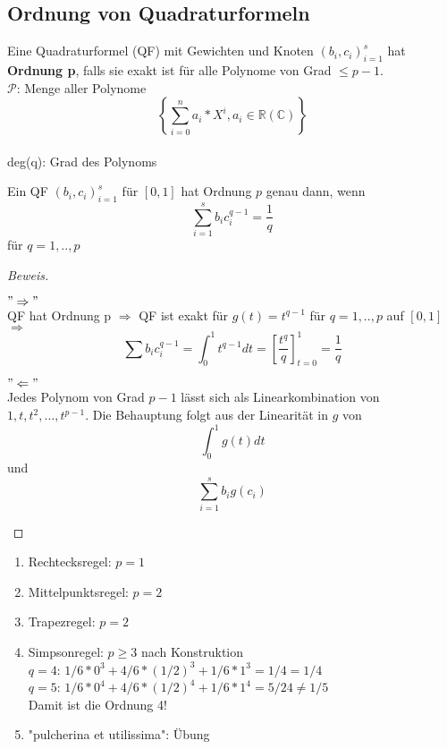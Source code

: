 \subsection{Ordnung von Quadraturformeln}

\begin{definition}
Eine Quadraturformel (QF) mit Gewichten und Knoten $(b_i, c_i)_{i=1}^{s}$ hat \textbf{Ordnung p}, falls sie exakt ist für alle Polynome von Grad $ \leq p-1$.\\
$\mathcal{P}$: Menge aller Polynome $$\left\{ \sum_{i=0}^{n}a_i*X^i , a_i \in \mathbb{R} (\mathbb{C}) \right\}  $$ \\
deg(q): Grad des Polynoms
\end{definition}

\begin{theorem}
Ein QF $(b_i, c_i)_{i=1}^{s}$ für $[0,1]$ hat Ordnung $p$ genau dann, wenn
$$\sum_{i=1}^{s} b_i c_i^{q-1} = \frac{1}{q}$$ für $q = 1,..,p$
\begin{proof}[Beweis]
\begin{description}
  \item
\end{description}
\begin{description}
  \item $"\Rightarrow"$ \\
  QF hat Ordnung p $\Rightarrow$ QF ist exakt für $g(t) = t^{q-1}$ für $q = 1,..,p$ auf $[0,1]$ \\
  $\Rightarrow$ $$\sum b_i c_i^{q-1} = \int_{0}^{1} t^{q-1} dt = [\frac{t^q}{q}]_{t=0}^{1} = \frac{1}{q}$$
  \item $"\Leftarrow"$\\
  Jedes Polynom von Grad $p-1$ lässt sich als Linearkombination von $1, t, t^2, ...,t^{p-1}$. Die Behauptung folgt aus der Linearität in $g$ von $$\int_{0}^{1} g(t) dt$$ und $$\sum_{i=1}^{s}b_i g(c_i)$$
\end{description}
\end{proof}
\end{theorem}

\begin{example}
\begin{description}
  \item
\end{description}

\begin{enumerate}
  \item Rechtecksregel: $p=1$
  \item Mittelpunktsregel: $p=2$
  \item Trapezregel: $p=2$
  \item Simpsonregel: $p \geq 3$ nach Konstruktion \\
  $q = 4$: $1/6 * 0^3 + 4/6 * (1/2)^3 + 1/6 * 1^3 = 1/4 = 1/4$ \\
  $q = 5$: $1/6 * 0^4 + 4/6 * (1/2)^4 + 1/6 * 1^4 = 5/24 \neq 1/5$ \\
  Damit ist die Ordnung 4!
  \item "pulcherina et utilissima": Übung
\end{enumerate}
\end{example}


